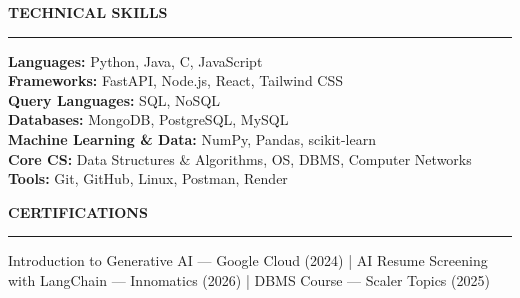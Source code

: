 \documentclass[11pt]{article}
\renewcommand{\section}[1]{
  \par\vspace{3pt}
  {\large\textbf{#1}}
  \vspace{2pt}
  \hrule
  \vspace{4pt}
}
\begin{document}
\section{TECHNICAL SKILLS}
\textbf{Languages:} Python, Java, C, JavaScript \\
\textbf{Frameworks:} FastAPI, Node.js, React, Tailwind CSS \\
\textbf{Query Languages:} SQL, NoSQL \\
\textbf{Databases:} MongoDB, PostgreSQL, MySQL \\
\textbf{Machine Learning \& Data:} NumPy, Pandas, scikit-learn \\
\textbf{Core CS:} Data Structures \& Algorithms, OS, DBMS, Computer Networks \\
\textbf{Tools:} Git, GitHub, Linux, Postman, Render
\vspace{2pt}
\section{CERTIFICATIONS}
Introduction to Generative AI — Google Cloud (2024) \;|\;
AI Resume Screening with LangChain — Innomatics (2026) \;|\;
DBMS Course — Scaler Topics (2025)
\end{document}
